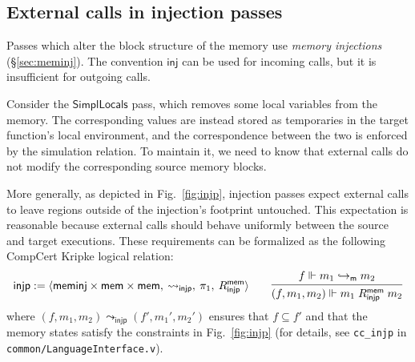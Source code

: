 \documentclass[draft,11pt]{report}
\theoremstyle{definition}
\newcommand{\kw}[1]{\ensuremath{ \mathsf{#1} }}
\begin{document}

\subsection{External calls in injection passes} \label{sec:injp} %

Passes which alter the block structure of the memory
use \emph{memory injections} (\S\ref{sec:meminj}).
The convention \kw{inj} can be used for incoming calls,
but it is insufficient for outgoing calls.

Consider the \kw{SimplLocals} pass,
which removes some local variables %
from the memory.
The corresponding values are instead stored
as temporaries in the target function's local environment,
and the correspondence between the two
is enforced by the simulation relation.
To maintain it,
we need to know that
external calls do not modify
the corresponding source memory blocks.

More generally,
as depicted in Fig.~\ref{fig:injp},
injection passes expect external calls
to leave regions outside of the injection's footprint untouched.
This expectation is reasonable because
external calls
should behave uniformly between the source and target executions.
These requirements can be formalized as the
following CompCert Kripke logical relation:
\[
  \kw{injp} :=
    \langle
      \kw{meminj} \times \kw{mem} \times \kw{mem}, \:
      {\leadsto_\kw{injp}}, \:
      \pi_1, \:
      R^\kw{mem}_\kw{injp}
    \rangle
  \qquad
  \begin{prooftree}
    \hypo{f \Vdash m_1 \hookrightarrow_\kw{m} m_2}
    \infer1{(f, m_1, m_2) \Vdash m_1 \mathrel{R^\kw{mem}_\kw{injp}} m_2}
  \end{prooftree}
\]
where $(f, m_1, m_2) \leadsto_\kw{injp} (f', m_1', m_2')$
ensures that $f \subseteq f'$ and that the memory states
satisfy the constraints in Fig.~\ref{fig:injp}
(for details,
see \texttt{cc\_injp} in \texttt{common/LanguageInterface.v}).
\end{document}
